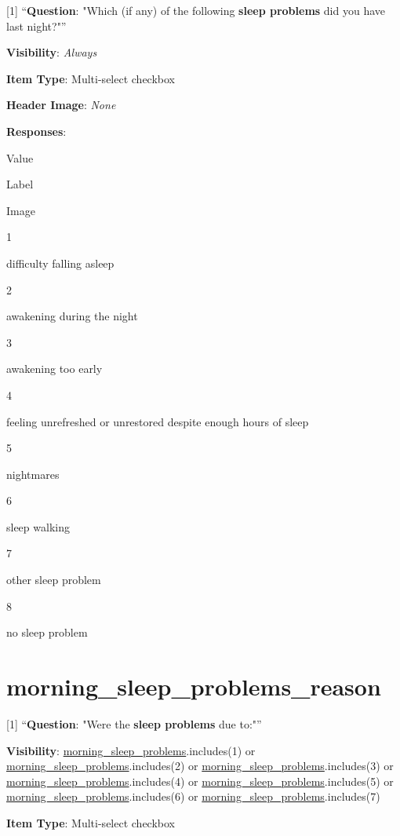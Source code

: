 \documentclass[]{book}
\begin{document}
{[}1{]} ``\textbf{Question}: "Which (if any) of the following \textbf{sleep problems} did you have last night?"''

\textbf{Visibility}: \emph{Always}

\textbf{Item Type}: Multi-select checkbox

\textbf{Header Image}: \emph{None}

\textbf{Responses}:

Value

Label

Image

1

difficulty falling asleep

2

awakening during the night

3

awakening too early

4

feeling unrefreshed or unrestored despite enough hours of sleep

5

nightmares

6

sleep walking

7

other sleep problem

8

no sleep problem

\hypertarget{morning_sleep_problems_reason}{%
\section{morning\_sleep\_problems\_reason}\label{morning_sleep_problems_reason}}

{[}1{]} ``\textbf{Question}: "Were the \textbf{sleep problems} due to:"''

\textbf{Visibility}: \protect\hyperlink{morning_sleep_problems}{morning\_sleep\_problems}.includes(1) or \protect\hyperlink{morning_sleep_problems}{morning\_sleep\_problems}.includes(2) or \protect\hyperlink{morning_sleep_problems}{morning\_sleep\_problems}.includes(3) or \protect\hyperlink{morning_sleep_problems}{morning\_sleep\_problems}.includes(4) or \protect\hyperlink{morning_sleep_problems}{morning\_sleep\_problems}.includes(5) or \protect\hyperlink{morning_sleep_problems}{morning\_sleep\_problems}.includes(6) or \protect\hyperlink{morning_sleep_problems}{morning\_sleep\_problems}.includes(7)

\textbf{Item Type}: Multi-select checkbox
\end{document}

